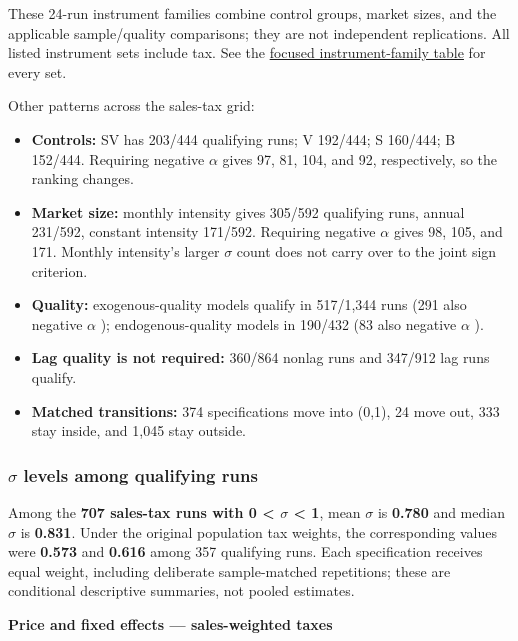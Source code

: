 \documentclass[10pt,]{article}
\providecommand{\tightlist}{%
  \setlength{\itemsep}{0pt}\setlength{\parskip}{0pt}}
\begin{document}
These 24-run instrument families combine control groups, market sizes,
and the applicable sample/quality comparisons; they are not independent
replications. All listed instrument sets include tax. See the
\href{tables/2026-10-27_sales_price_no_FE_instrument_families.csv}{focused
instrument-family table} for every set.

Other patterns across the sales-tax grid:

\begin{itemize}
\tightlist
\item
  \textbf{Controls:} SV has 203/444 qualifying runs; V 192/444; S
  160/444; B 152/444. Requiring negative \(\alpha\) gives 97, 81, 104,
  and 92, respectively, so the ranking changes.
\item
  \textbf{Market size:} monthly intensity gives 305/592 qualifying runs,
  annual 231/592, constant intensity 171/592. Requiring negative
  \(\alpha\) gives 98, 105, and 171. Monthly intensity's larger
  \(\sigma\) count does not carry over to the joint sign criterion.
\item
  \textbf{Quality:} exogenous-quality models qualify in 517/1,344 runs
  (291 also negative \(\alpha\) ); endogenous-quality models in 190/432
  (83 also negative \(\alpha\) ).
\item
  \textbf{Lag quality is not required:} 360/864 nonlag runs and 347/912
  lag runs qualify.
\item
  \textbf{Matched transitions:} 374 specifications move into (0,1), 24
  move out, 333 stay inside, and 1,045 stay outside.
\end{itemize}

\subsubsection{\texorpdfstring{\(\sigma\) levels among qualifying
runs}{\textbackslash{}sigma levels among qualifying runs}}\label{sigma-levels-among-qualifying-runs}

Among the \textbf{707 sales-tax runs with 0 \textless{} \(\sigma\)
\textless{} 1}, mean \(\sigma\) is \textbf{0.780} and median \(\sigma\)
is \textbf{0.831}. Under the original population tax weights, the
corresponding values were \textbf{0.573} and \textbf{0.616} among 357
qualifying runs. Each specification receives equal weight, including
deliberate sample-matched repetitions; these are conditional descriptive
summaries, not pooled estimates.

\textbf{Price and fixed effects --- sales-weighted taxes}
\end{document}
